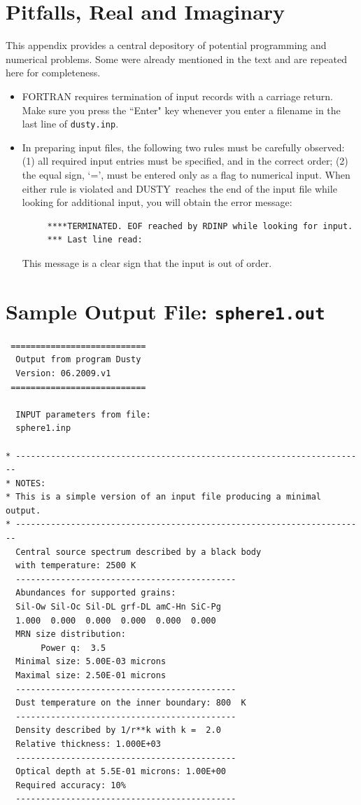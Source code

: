\documentclass[11pt]{article}
\def\D  {{\sf DUSTY}}
\begin{document}
\begin{appendix}
\section{Pitfalls, Real and Imaginary} \label{pitfalls}

This appendix provides a central depository of potential programming and
numerical problems. Some were already mentioned in the text and are repeated
here for completeness.

\begin{itemize}
\item
FORTRAN requires termination of input records with a carriage return. Make sure
you press the ``Enter" key whenever you enter a filename in the last line of
{\tt dusty.inp}.

\item
In preparing input files, the following two rules must be carefully observed:
(1) all required input entries must be specified, and in the correct order; (2)
the equal sign, `=', must be entered only as a flag to numerical input. When
either rule is violated and \D\ reaches the end of the input file while looking
for additional input, you will obtain the error message:
\begin{verbatim}
     ****TERMINATED. EOF reached by RDINP while looking for input.
     *** Last line read:
\end{verbatim}
This message is a clear sign that the input is out of order.

\end{itemize}

\vspace {1cm}

\section{Sample Output File: {\tt sphere1.out}}
\label{sphere1}

\begin{verbatim}
 ===========================
  Output from program Dusty
  Version: 06.2009.v1
 ===========================

  INPUT parameters from file:
  sphere1.inp

* ----------------------------------------------------------------------
* NOTES:
* This is a simple version of an input file producing a minimal output.
* ----------------------------------------------------------------------
  Central source spectrum described by a black body
  with temperature: 2500 K
  --------------------------------------------
  Abundances for supported grains:
  Sil-Ow Sil-Oc Sil-DL grf-DL amC-Hn SiC-Pg
  1.000  0.000  0.000  0.000  0.000  0.000
  MRN size distribution:
       Power q:  3.5
  Minimal size: 5.00E-03 microns
  Maximal size: 2.50E-01 microns
  --------------------------------------------
  Dust temperature on the inner boundary: 800  K
  --------------------------------------------
  Density described by 1/r**k with k =  2.0
  Relative thickness: 1.000E+03
  --------------------------------------------
  Optical depth at 5.5E-01 microns: 1.00E+00
  Required accuracy: 10%
  --------------------------------------------


\end{verbatim}
\end{appendix}
\end{document}

